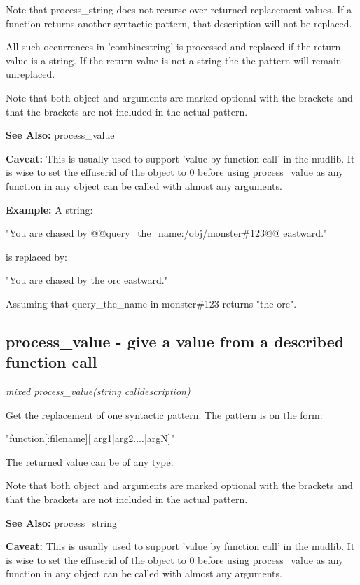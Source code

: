     Note that process\_string does not recurse over returned
    replacement values. If a function returns another syntactic
    pattern, that description will not be replaced.

    All such occurrences in 'combinestring' is processed and replaced if
    the return value is a string. If the return value is not a string
    the the pattern will remain unreplaced.

    Note that both object and arguments are marked optional with the
    brackets and that the brackets are not included in the actual pattern.

    {\bf See Also: }    process\_value

    {\bf Caveat: }  This is usually used to support 'value by function call' in the mudlib.
    It is wise to set the effuserid of the object to 0 before using
    process\_value as any function in any object can be called with almost
    any arguments.

{\bf Example:}
    A string:   

      "You are chased by @@query\_the\_name:/obj/monster\#123@@ eastward."

    is replaced by: 

      "You are chased by the orc eastward."

        Assuming that query\_the\_name in monster\#123 returns "the orc".



\subsection{process\_value - give a value from a described function call}

    {\em mixed process\_value(string calldescription)}

    Get the replacement of one syntactic pattern. The pattern is on
    the form:

           "function[:filename][|arg1|arg2....|argN]"

    The returned value can be of any type.

    Note that both object and arguments are marked optional with the
    brackets and that the brackets are not included in the actual pattern.

    {\bf See Also: }    process\_string

    {\bf Caveat: }  This is usually used to support 'value by function call' in the mudlib.
    It is wise to set the effuserid of the object to 0 before using
    process\_value as any function in any object can be called with almost
    any arguments.



